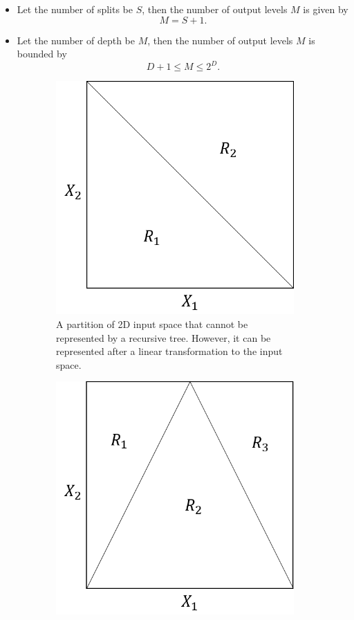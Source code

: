 \begin{refsection}
\begin{remark}\hfill
\begin{itemize}
	\item Let the number of splits be $S$, then the number of output levels $M$ is given by
	$$M = S + 1.$$
	\item Let the number of depth be $M$, then the number of output levels $M$ is bounded by
	$$D+ 1 \leq  M \leq 2^D.$$
\end{itemize}	
\end{remark}


\begin{figure}[H]
	\centering	
	\begin{subfigure}[b]{0.45\textwidth}
		\centering
		\includegraphics[width=0.7\linewidth]{../figures/statisticalLearning/treeMethods/2DInputSpacePartitionFailureExampleOne}
		\caption{A partition of 2D input space that cannot be represented by a recursive tree. However, it can be represented after a linear transformation to the input space.}
	\end{subfigure}\quad
	\begin{subfigure}[b]{0.45\textwidth}
		\centering
		\includegraphics[width=0.7\linewidth]{../figures/statisticalLearning/treeMethods/2DInputSpacePartitionFailureExampleTwo}

\end{subfigure}
\end{figure}
\end{refsection}
